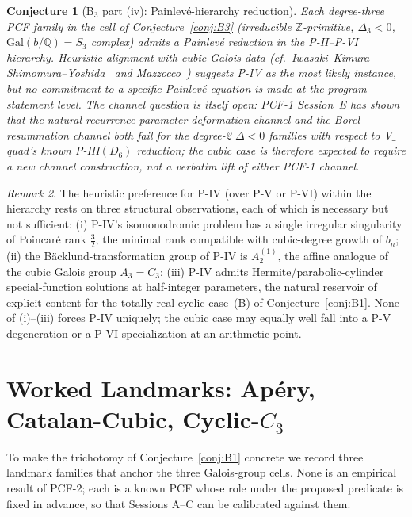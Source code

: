 \documentclass[11pt,a4paper]{article}
\newtheorem{conjecture}{Conjecture}
\theoremstyle{definition}
\theoremstyle{remark}
\newtheorem{remark}[conjecture]{Remark}
\newcommand{\Q}{\mathbb{Q}}
\newcommand{\Z}{\mathbb{Z}}
\newcommand{\Gal}{\mathrm{Gal}}
\begin{document}
\begin{conjecture}[B$_{3}$ part (iv): Painlev\'e-hierarchy reduction]\label{conj:B4}
Each degree-three PCF family in the cell of Conjecture~\ref{conj:B3}
(irreducible $\Z$-primitive, $\Delta_{3}<0$, $\Gal(b/\Q)=S_{3}$ complex)
admits a Painlev\'e reduction in the P-II--P-VI hierarchy. Heuristic
alignment with cubic Galois data
(cf.~Iwasaki--Kimura--Shimomura--Yoshida~\cite{Iwasaki1991} and
Mazzocco~\cite{Mazzocco2003}) suggests P-IV as the most likely
instance, but no commitment to a specific Painlev\'e equation is made
at the program-statement level. The channel question is itself open:
PCF-1 Session~E has shown that the natural recurrence-parameter
deformation channel and the Borel-resummation channel both
\emph{fail} for the degree-2 $\Delta<0$ families with respect to
V$\_$quad's known P-III$(D_{6})$ reduction; the cubic case is
therefore expected to require a new channel construction, not a
verbatim lift of either PCF-1 channel.
\end{conjecture}

\begin{remark}\label{rem:painleveIV}
The heuristic preference for P-IV (over P-V or P-VI) within the
hierarchy rests on three structural observations, each of which is
necessary but not sufficient: (i) P-IV's isomonodromic problem has a
single irregular singularity of Poincar\'e rank $\frac{3}{2}$, the
minimal rank compatible with cubic-degree growth of $b_{n}$;
(ii) the B\"acklund-transformation group of P-IV is $A_{2}^{(1)}$, the
affine analogue of the cubic Galois group $A_{3}=C_{3}$;
(iii) P-IV admits Hermite/parabolic-cylinder special-function solutions
at half-integer parameters, the natural reservoir of explicit content
for the totally-real cyclic case~(B) of Conjecture~\ref{conj:B1}. None
of (i)--(iii) forces P-IV uniquely; the cubic case may equally well
fall into a P-V degeneration or a P-VI specialization at an
arithmetic point.
\end{remark}

\section{Worked Landmarks: Ap\'ery, Catalan-Cubic, Cyclic-$C_{3}$}\label{sec:landmarks}

To make the trichotomy of Conjecture~\ref{conj:B1} concrete we record
three landmark families that anchor the three Galois-group cells. None
is an empirical result of PCF-2; each is a known PCF whose role under
the proposed predicate is fixed in advance, so that Sessions A--C can be
calibrated against them.
\end{document}
